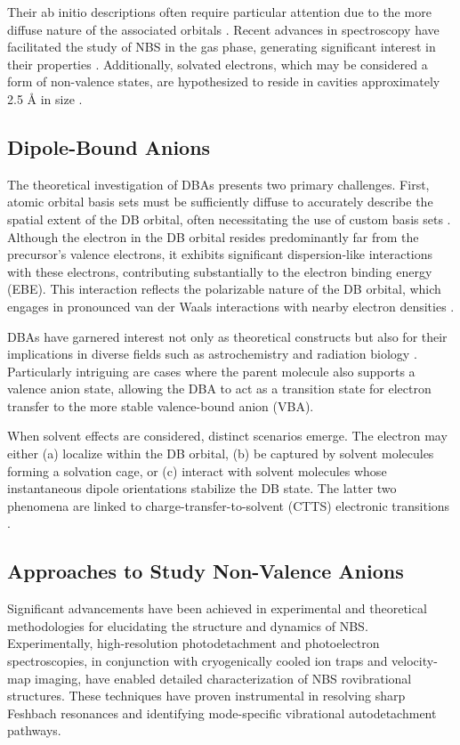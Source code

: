 Their ab initio descriptions often require particular attention due to the more diffuse nature of the associated orbitals \cite{simons2008molecular,simons2023molecular}. 
 Recent advances in spectroscopy have facilitated the study of NBS in the gas phase, generating significant interest in their properties \cite{kang2024reaction}. Additionally, solvated electrons, which may be considered a form of non-valence states, are hypothesized to reside in cavities approximately 2.5 \r{A} in size \cite{herbert2017hydrated}.

\subsection{Dipole-Bound Anions}
The theoretical investigation of DBAs presents two primary challenges. First, atomic orbital basis sets must be sufficiently diffuse to accurately describe the spatial extent of the DB orbital, often necessitating the use of custom basis sets \cite{skurski2000choose}. Although the electron in the DB orbital resides predominantly far from the precursor's valence electrons, it exhibits significant dispersion-like interactions with these electrons, contributing substantially to the electron binding energy (EBE). This interaction reflects the polarizable nature of the DB orbital, which engages in pronounced van der Waals interactions with nearby electron densities \cite{gutowski1996contribution}.

DBAs have garnered interest not only as theoretical constructs but also for their implications in diverse fields such as astrochemistry \cite{fortenberry2015interstellar} and radiation biology \cite{narayanan2023secondary,sedmidubska2024interaction}. Particularly intriguing are cases where the parent molecule also supports a valence anion state, allowing the DBA to act as a transition state for electron transfer to the more stable valence-bound anion (VBA).

When solvent effects are considered, distinct scenarios emerge. The electron may either (a) localize within the DB orbital, (b) be captured by solvent molecules forming a solvation cage, or (c) interact with solvent molecules whose instantaneous dipole orientations stabilize the DB state. The latter two phenomena are linked to charge-transfer-to-solvent (CTTS) electronic transitions \cite{bradforth2002excited,chen2000precursors}.

\subsection{Approaches to Study Non-Valence Anions}
Significant advancements have been achieved in experimental and theoretical methodologies for elucidating the structure and dynamics of NBS. Experimentally, high-resolution photodetachment and photoelectron spectroscopies, in conjunction with cryogenically cooled ion traps and velocity-map imaging, have enabled detailed characterization of NBS rovibrational structures. These techniques have proven instrumental in resolving sharp Feshbach resonances and identifying mode-specific vibrational autodetachment pathways.

